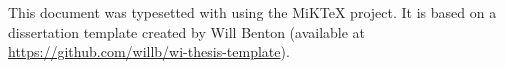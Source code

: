 This document was typesetted with \LaTeXe using the MiKTeX project. It is based on a dissertation template created by Will Benton (available at \url{https://github.com/willb/wi-thesis-template}).
